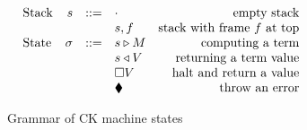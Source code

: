 \documentclass[../plutus-core-specification.tex]{subfiles}
\begin{document}
\begin{figure}[H]
\begin{subfigure}[c]{\linewidth}
    \centering
    \[\begin{array}{lrclr}
        \textrm{Stack} & s      & ::= & \cdot           & \textrm{empty stack}\\
                       &        &     & s,f             & \textrm{stack with frame $f$ at top}\\
        \textrm{State} & \sigma & ::= & s \triangleright M    & \textrm{computing a term}\\
                       &        &     & s \triangleleft V     & \textrm{returning a term value}\\
                       &        &     & \square V       & \textrm{halt and return a value}\\
                       &        &     & \blacklozenge{}      & \textrm{throw an error}
    \end{array}\]

    \caption{Grammar of CK machine states}
    \label{fig:typed-ck-frames}
\end{subfigure}


\begin{subfigure}[c]{\linewidth}


\end{subfigure}
\end{figure}
\end{document}

